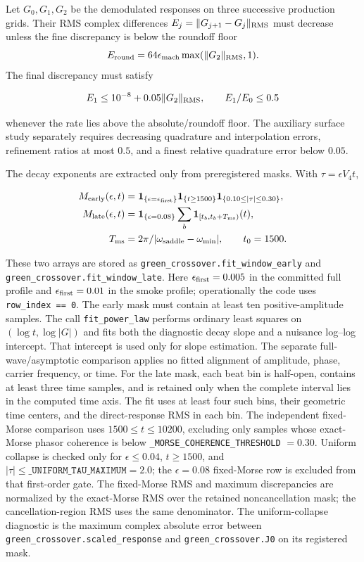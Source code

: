Let \(G_0,G_1,G_2\) be the demodulated responses on three successive
production grids.  Their RMS complex differences
\(E_j=\|G_{j+1}-G_j\|_{\rm RMS}\) must decrease unless the fine discrepancy
is below the roundoff floor
\[
 E_{\rm round}=64\epsilon_{\rm mach}
 \max(\|G_2\|_{\rm RMS},1).
\]
The final discrepancy must satisfy

\[
 E_1\leq10^{-8}+0.05\|G_2\|_{\rm RMS},\qquad
 E_1/E_0\leq0.5
\]

whenever the rate lies above the absolute/roundoff floor.  The auxiliary
surface study separately requires decreasing quadrature and interpolation
errors, refinement ratios at most \(0.5\), and a finest relative quadrature
error below \(0.05\).

The decay exponents are extracted only from preregistered masks.  With
\(\tau=\epsilon V_4t\),

\begin{equation}
 \begin{aligned}
 M_{\rm early}(\epsilon,t)
 &=\mathbf 1_{\{\epsilon=\epsilon_{\rm first}\}}
   \mathbf 1_{\{t\geq1500\}}
   \mathbf 1_{\{0.10\leq|\tau|\leq0.30\}},\\
 M_{\rm late}(\epsilon,t)
 &=\mathbf 1_{\{\epsilon=0.08\}}
   \sum_{b}\mathbf 1_{[t_b,t_b+T_{\rm ms})}(t),\\
 T_{\rm ms}&=2\pi/|\omega_{\rm saddle}-\omega_{\rm min}|,
 \qquad t_0=1500 .
 \end{aligned}
 \label{eq:fit-masks}
\end{equation}

These two arrays are stored as
\texttt{green\_crossover.fit\_window\_early} and
\texttt{green\_crossover.fit\_window\_late}.
Here \(\epsilon_{\rm first}=0.005\) in the committed full profile and
\(\epsilon_{\rm first}=0.01\) in the smoke profile; operationally the code
uses \texttt{row\_index == 0}.  The early mask must contain at least ten
positive-amplitude samples.  The
call \texttt{fit\_power\_law} performs ordinary least squares on
\((\log t,\log|G|)\) and fits both the diagnostic decay slope and a nuisance
log--log intercept.  That intercept is used only for slope estimation.  The
separate full-wave/asymptotic comparison applies no fitted alignment of
amplitude, phase, carrier frequency, or time.  For the
late mask, each beat bin is half-open, contains at least
three time samples, and is retained only when the complete interval lies in
the computed time axis.  The fit uses at least four such bins, their geometric
time centers, and the direct-response RMS in each bin.  The independent
fixed-Morse comparison uses \(1500\leq t\leq10200\), excluding only samples
whose exact-Morse phasor coherence is below
\texttt{\_MORSE\_COHERENCE\_THRESHOLD} \(=0.30\).  Uniform collapse is checked
only for \(\epsilon\leq0.04\), \(t\geq1500\), and
\(|\tau|\leq\texttt{\_UNIFORM\_TAU\_MAXIMUM}=2.0\); the
\(\epsilon=0.08\) fixed-Morse row is excluded from that first-order gate.
The fixed-Morse RMS and maximum discrepancies are normalized by the
exact-Morse RMS over the retained noncancellation mask; the cancellation-region
RMS uses the same denominator.  The uniform-collapse diagnostic is the
maximum complex absolute error between
\texttt{green\_crossover.scaled\_response} and
\texttt{green\_crossover.J0} on its registered mask.

